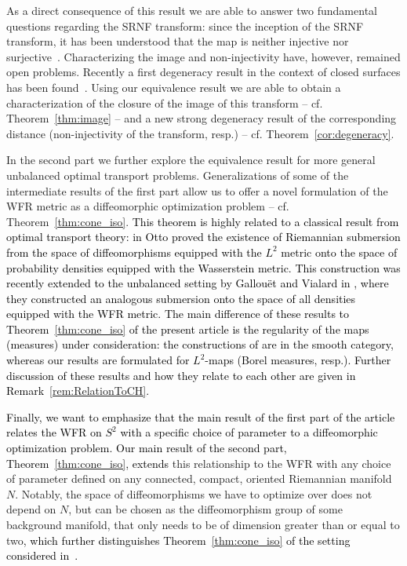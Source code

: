\documentclass[final,hidelinks,onefignum,onetabnum]{siamart220329}
\begin{document}
As a direct consequence of this result we are able to answer two fundamental questions regarding the SRNF transform: since the inception of the SRNF transform, it has been understood that the map is neither injective nor surjective~\cite{jermyn2017elastic}. Characterizing the image and non-injectivity have, however, remained open problems. Recently a first degeneracy result in the context of closed surfaces has been found~\cite{klassen2020closed}. Using our equivalence result we are able to obtain a characterization of the closure of the image of this transform -- cf. Theorem~\ref{thm:image} -- and a new strong degeneracy result of the corresponding distance (non-injectivity of the transform, resp.) -- cf. Theorem~\ref{cor:degeneracy}. 


In the second part we further explore the equivalence result for more general unbalanced optimal transport problems. Generalizations of some of the intermediate results of the first part  allow us to offer a novel formulation of the WFR metric as a diffeomorphic optimization problem -- cf. Theorem~\ref{thm:cone_iso}. 
\textcolor{black}{This theorem is highly related to a classical  result from optimal transport theory: in \cite{OttoPic} Otto proved the existence of  Riemannian submersion from the space of diffeomorphisms equipped with the $L^2$ metric onto the space of probability densities equipped with the Wasserstein metric. This construction was recently extended to the unbalanced setting by Gallou\"{e}t and Vialard in \cite{GALLOUET20184199}, where they constructed an analogous submersion onto the space of all densities equipped with the WFR metric. The main difference of these results to  Theorem~\ref{thm:cone_iso} of the present article is the regularity of the maps (measures) under consideration: the constructions of \cite{OttoPic,GALLOUET20184199} are in the smooth category, whereas our results are formulated for $L^2$-maps (Borel measures, resp.). Further discussion of these results and how they relate to each other are given in Remark~\ref{rem:RelationToCH}.}

\textcolor{black}{Finally, we want to emphasize that the main result of the first part of the article relates the WFR on $S^2$ with a specific choice of parameter to a diffeomorphic optimization problem. Our main result of the second part, Theorem~\ref{thm:cone_iso}, extends} this relationship to the WFR with any choice of parameter defined on any connected, compact, oriented Riemannian manifold $N$. Notably, the space of diffeomorphisms we have to optimize over does not  depend on $N$, but can be chosen as the diffeomorphism group of some background manifold, that only needs to be of dimension greater than or equal to two\textcolor{black}{, which  further distinguishes Theorem~\ref{thm:cone_iso} of the setting considered in~\cite{OttoPic,GALLOUET20184199}.} 
\end{document}
